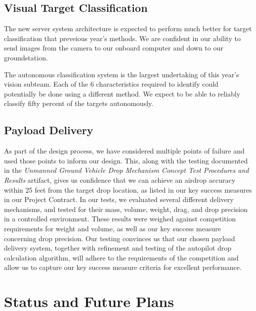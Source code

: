 \documentclass[]{auvsi_doc}
\begin{document}
\subsection{Visual Target Classification}
The new server system architecture is expected to perform much better for target classification that preveious year's methods. We are
confident in our ability to send images from the camera to our onboard computer and down to our groundstation.

The autonomous classification system is the largest undertaking of this year's vision subteam. Each of the 6 characteristics
required to identify could potentially be done using a different method. We expect to be able to reliably classify fifty percent of the
targets autonomously.
\subsection{Payload Delivery}
As part of the design process, we have considered multiple points of failure and used those points to inform our design. This, along with the testing documented in the \textit{Unmanned Ground Vehicle Drop Mechanism Concept Test Procedures and Results} artifact, gives us confidence that we can achieve an airdrop accuracy within 25 feet from the target drop location, as listed in our key success measures in our Project Contract. In our tests, we evaluated several different delivery mechanisms, and tested for their mass, volume, weight, drag, and drop precision in a controlled environment. These results were weighed against competition requirements for weight and volume, as well as our key success measure concerning drop precision. Our testing convinces us that our chosen payload delivery system, together with refinement and testing of the autopilot drop calculation algorithm, will adhere to the requirements of the competition and allow us to capture our key success measure criteria for excellent performance.
\section{Status and Future Plans}
\end{document}
